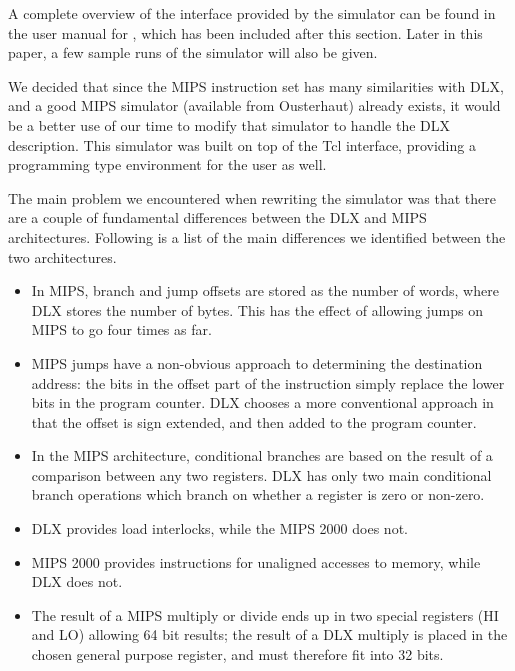 A complete overview of the interface provided by the simulator can be
found in the user manual for \dlxsim, which has been included after
this section.  Later in this paper, a few sample runs of the simulator
will also be given.

We decided that since the MIPS instruction set has many similarities
with DLX, and a good MIPS simulator (available from Ousterhaut)
already exists, it would be a better use of our time to modify that
simulator to handle the DLX description.  This simulator was built on
top of the Tcl interface, providing a programming type environment for
the user as well.

The main problem we encountered when rewriting the simulator was that
there are a couple of fundamental differences between the DLX and MIPS
architectures.  Following is a list of the main differences we
identified between the two architectures.

\begin{itemize}

\item In MIPS, branch and jump offsets are stored as the number of
words, where DLX stores the number of bytes.  This has the effect of
allowing jumps on MIPS to go four times as far.

\item MIPS jumps have a non-obvious approach to determining the
destination address: the bits in the offset part of the instruction
simply replace the lower bits in the program counter.  DLX chooses a
more conventional approach in that the offset is sign extended, and
then added to the program counter.

\item In the MIPS architecture, conditional branches are based on the
result of a comparison between any two registers.  DLX has only two
main conditional branch operations which branch on whether a register
is zero or non-zero.

\item DLX provides load interlocks, while the MIPS 2000 does not.

\item MIPS 2000 provides instructions for unaligned accesses to
memory, while DLX does not.

\item The result of a MIPS multiply or divide ends up in two special
registers (HI and LO) allowing 64 bit results; the result of a DLX
multiply is placed in the chosen general purpose register, and must
therefore fit into 32 bits.

\end{itemize}

